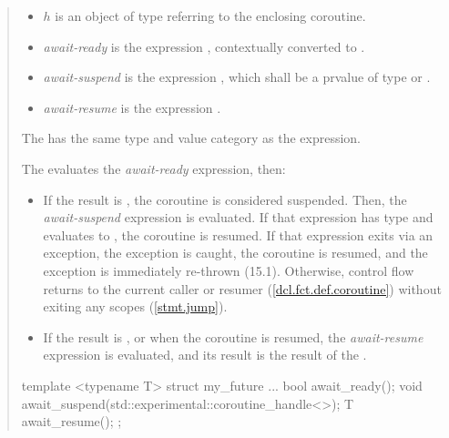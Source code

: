 \begin{quote}
\begin{itemize}
  \item $h$ is an object of type  referring to the enclosing coroutine.
  \item \textit{await-ready} is the expression , contextually converted to .
  \item \textit{await-suspend} is the expression , which shall be a prvalue of type  or .
  \item \textit{await-resume} is the expression .
\end{itemize}

\pnum The  has the same type and value category as the  expression.

\pnum The  evaluates the \textit{await-ready} expression, then:
\begin{itemize}
  \item If the result is , the coroutine is considered suspended. Then, the \textit{await-suspend} expression is evaluated. If that expression has
  type  and evaluates to , the coroutine is resumed.
  If that expression exits via an exception, the exception is caught, the coroutine is resumed, and the exception is immediately re-thrown (15.1). Otherwise, control flow returns to the current caller or resumer (\ref{dcl.fct.def.coroutine}) without exiting any scopes (\ref{stmt.jump}).
  \item If the result is , or when the coroutine is resumed, the \textit{await-resume} expression is evaluated, and its result is the result of the .
  
\end{itemize}

\pnum
\enterexample
\begin{codeblock}	
template <typename T>
struct my_future {
  ...
  bool await_ready();
  void await_suspend(std::experimental::coroutine_handle<>);
  T await_resume();
};
  

\end{codeblock}
\end{quote}
